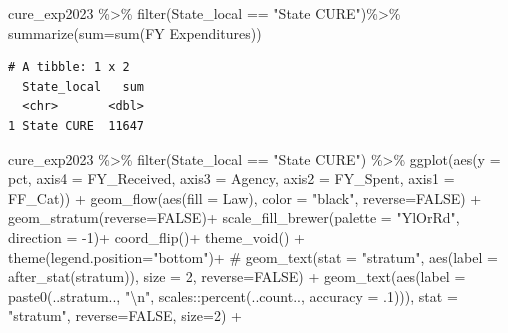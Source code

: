 \documentclass[
  letterpaper,
  DIV=11,
  numbers=noendperiod]{scrreport}
\newenvironment{Shaded}{\begin{snugshade}}{\end{snugshade}}
\newcommand{\AttributeTok}[1]{\textcolor[rgb]{0.40,0.45,0.13}{#1}}
\newcommand{\CommentTok}[1]{\textcolor[rgb]{0.37,0.37,0.37}{#1}}
\newcommand{\ConstantTok}[1]{\textcolor[rgb]{0.56,0.35,0.01}{#1}}
\newcommand{\DecValTok}[1]{\textcolor[rgb]{0.68,0.00,0.00}{#1}}
\newcommand{\FunctionTok}[1]{\textcolor[rgb]{0.28,0.35,0.67}{#1}}
\newcommand{\NormalTok}[1]{\textcolor[rgb]{0.00,0.23,0.31}{#1}}
\newcommand{\SpecialCharTok}[1]{\textcolor[rgb]{0.37,0.37,0.37}{#1}}
\newcommand{\StringTok}[1]{\textcolor[rgb]{0.13,0.47,0.30}{#1}}
\begin{document}
\begin{Shaded}
\begin{Highlighting}[]
\NormalTok{cure\_exp2023 }\SpecialCharTok{\%\textgreater{}\%} 
  \FunctionTok{filter}\NormalTok{(State\_local }\SpecialCharTok{==} \StringTok{"State CURE"}\NormalTok{)}\SpecialCharTok{\%\textgreater{}\%} 
  \FunctionTok{summarize}\NormalTok{(}\AttributeTok{sum=}\FunctionTok{sum}\NormalTok{(}\StringTok{\textasciigrave{}}\AttributeTok{FY Expenditures}\StringTok{\textasciigrave{}}\NormalTok{))}
\end{Highlighting}
\end{Shaded}

\begin{verbatim}
# A tibble: 1 x 2
  State_local   sum
  <chr>       <dbl>
1 State CURE  11647
\end{verbatim}

\begin{Shaded}
\begin{Highlighting}[]
\NormalTok{cure\_exp2023 }\SpecialCharTok{\%\textgreater{}\%} 
  \FunctionTok{filter}\NormalTok{(State\_local }\SpecialCharTok{==} \StringTok{"State CURE"}\NormalTok{) }\SpecialCharTok{\%\textgreater{}\%}
  \FunctionTok{ggplot}\NormalTok{(}\FunctionTok{aes}\NormalTok{(}\AttributeTok{y =}\NormalTok{ pct, }
             \AttributeTok{axis4 =}\NormalTok{ FY\_Received, }
             \AttributeTok{axis3 =}\NormalTok{ Agency,  }
             \AttributeTok{axis2 =}\NormalTok{ FY\_Spent, }
             \AttributeTok{axis1 =}\NormalTok{ FF\_Cat)) }\SpecialCharTok{+}
  \FunctionTok{geom\_flow}\NormalTok{(}\FunctionTok{aes}\NormalTok{(}\AttributeTok{fill =}\NormalTok{ Law), }\AttributeTok{color =} \StringTok{"black"}\NormalTok{, }\AttributeTok{reverse=}\ConstantTok{FALSE}\NormalTok{) }\SpecialCharTok{+}
  \FunctionTok{geom\_stratum}\NormalTok{(}\AttributeTok{reverse=}\ConstantTok{FALSE}\NormalTok{)}\SpecialCharTok{+}
  \FunctionTok{scale\_fill\_brewer}\NormalTok{(}\AttributeTok{palette =} \StringTok{"YlOrRd"}\NormalTok{, }\AttributeTok{direction =} \SpecialCharTok{{-}}\DecValTok{1}\NormalTok{)}\SpecialCharTok{+}
  \FunctionTok{coord\_flip}\NormalTok{()}\SpecialCharTok{+}
  \FunctionTok{theme\_void}\NormalTok{() }\SpecialCharTok{+} 
  \FunctionTok{theme}\NormalTok{(}\AttributeTok{legend.position=}\StringTok{"bottom"}\NormalTok{)}\SpecialCharTok{+}
 \CommentTok{\# geom\_text(stat = "stratum", aes(label = after\_stat(stratum)), size = 2, reverse=FALSE) +}
  \FunctionTok{geom\_text}\NormalTok{(}\FunctionTok{aes}\NormalTok{(}\AttributeTok{label =} \FunctionTok{paste0}\NormalTok{(..stratum.., }\StringTok{"}\SpecialCharTok{\textbackslash{}n}\StringTok{"}\NormalTok{, scales}\SpecialCharTok{::}\FunctionTok{percent}\NormalTok{(..count.., }\AttributeTok{accuracy =}\NormalTok{ .}\DecValTok{1}\NormalTok{))), }\AttributeTok{stat =} \StringTok{"stratum"}\NormalTok{, }\AttributeTok{reverse=}\ConstantTok{FALSE}\NormalTok{, }\AttributeTok{size=}\DecValTok{2}\NormalTok{) }\SpecialCharTok{+}


\end{Highlighting}
\end{Shaded}
\end{document}
